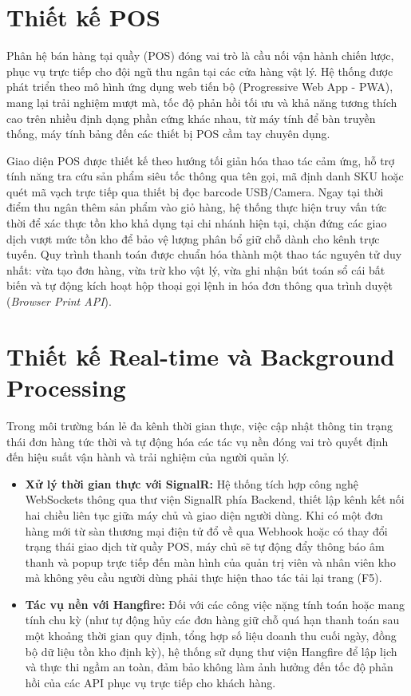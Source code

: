\documentclass[12pt,a4paper]{report}
\begin{document}
	\section{Thiết kế POS}
	Phân hệ bán hàng tại quầy (POS) đóng vai trò là cầu nối vận hành chiến lược, phục vụ trực tiếp cho đội ngũ thu ngân tại các cửa hàng vật lý. Hệ thống được phát triển theo mô hình ứng dụng web tiến bộ (Progressive Web App - PWA), mang lại trải nghiệm mượt mà, tốc độ phản hồi tối ưu và khả năng tương thích cao trên nhiều định dạng phần cứng khác nhau, từ máy tính để bàn truyền thống, máy tính bảng đến các thiết bị POS cầm tay chuyên dụng.
	\par
	Giao diện POS được thiết kế theo hướng tối giản hóa thao tác cảm ứng, hỗ trợ tính năng tra cứu sản phẩm siêu tốc thông qua tên gọi, mã định danh SKU hoặc quét mã vạch trực tiếp qua thiết bị đọc barcode USB/Camera. Ngay tại thời điểm thu ngân thêm sản phẩm vào giỏ hàng, hệ thống thực hiện truy vấn tức thời để xác thực tồn kho khả dụng tại chi nhánh hiện tại, chặn đứng các giao dịch vượt mức tồn kho để bảo vệ lượng phân bổ giữ chỗ dành cho kênh trực tuyến. Quy trình thanh toán được chuẩn hóa thành một thao tác nguyên tử duy nhất: vừa tạo đơn hàng, vừa trừ kho vật lý, vừa ghi nhận bút toán sổ cái bất biến và tự động kích hoạt hộp thoại gọi lệnh in hóa đơn thông qua trình duyệt (\textit{Browser Print API}).
	
	\section{Thiết kế Real-time và Background Processing}
	Trong môi trường bán lẻ đa kênh thời gian thực, việc cập nhật thông tin trạng thái đơn hàng tức thời và tự động hóa các tác vụ nền đóng vai trò quyết định đến hiệu suất vận hành và trải nghiệm của người quản lý.
	\par
	\begin{itemize}
		\item \textbf{Xử lý thời gian thực với SignalR:} Hệ thống tích hợp công nghệ WebSockets thông qua thư viện SignalR phía Backend, thiết lập kênh kết nối hai chiều liên tục giữa máy chủ và giao diện người dùng. Khi có một đơn hàng mới từ sàn thương mại điện tử đổ về qua Webhook hoặc có thay đổi trạng thái giao dịch từ quầy POS, máy chủ sẽ tự động đẩy thông báo âm thanh và popup trực tiếp đến màn hình của quản trị viên và nhân viên kho mà không yêu cầu người dùng phải thực hiện thao tác tải lại trang (F5).
		\item \textbf{Tác vụ nền với Hangfire:} Đối với các công việc nặng tính toán hoặc mang tính chu kỳ (như tự động hủy các đơn hàng giữ chỗ quá hạn thanh toán sau một khoảng thời gian quy định, tổng hợp số liệu doanh thu cuối ngày, đồng bộ dữ liệu tồn kho định kỳ), hệ thống sử dụng thư viện Hangfire để lập lịch và thực thi ngầm an toàn, đảm bảo không làm ảnh hưởng đến tốc độ phản hồi của các API phục vụ trực tiếp cho khách hàng.
	\end{itemize}
	
\end{document}
